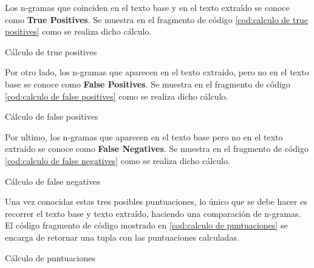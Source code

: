 Los n-gramas que coinciden en el texto base y en el texto extraído se conoce como \textbf{True Positives}.
Se muestra en el fragmento de código \ref{cod:calculo de true positives} como se realiza dicho cálculo.

\begin{codefloat}
  
  \caption{Cálculo de true positives}
  \label{cod:calculo de true positives}
\end{codefloat}

Por otro lado, los n-gramas que aparecen en el texto extraído, pero no en el texto base se conoce como 
\textbf{False Positives}. Se muestra en el fragmento de código \ref{cod:calculo de false positives} como 
se realiza dicho cálculo.

\begin{codefloat}
  
  \caption{Cálculo de false positives}
  \label{cod:calculo de false positives}
\end{codefloat}

Por ultimo, los n-gramas que aparecen en el texto base pero no en el texto extraído se conoce como 
\textbf{False Negatives}. Se muestra en el fragmento de código \ref{cod:calculo de false negatives} como 
se realiza dicho cálculo.

\begin{codefloat}
  
  \caption{Cálculo de false negatives}
  \label{cod:calculo de false negatives}
\end{codefloat}

Una vez conocidas estas tres posibles puntuaciones, lo único que se debe hacer es recorrer el texto base
y texto extraído, haciendo una comparación de n-gramas. El código fragmento de código mostrado en
\ref{cod:calculo de puntuaciones} se encarga de retornar una tupla con las puntuaciones calculadas.

\begin{codefloat}
  
  \caption{Cálculo de puntuaciones}
  \label{cod:calculo de puntuaciones}
\end{codefloat}


